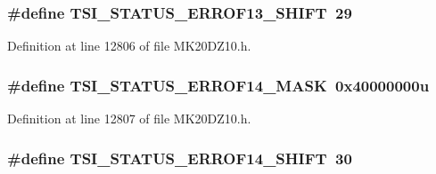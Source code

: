 \subsubsection[{\texorpdfstring{T\+S\+I\+\_\+\+S\+T\+A\+T\+U\+S\+\_\+\+E\+R\+R\+O\+F13\+\_\+\+S\+H\+I\+FT}{TSI_STATUS_ERROF13_SHIFT}}]{\setlength{\rightskip}{0pt plus 5cm}\#define T\+S\+I\+\_\+\+S\+T\+A\+T\+U\+S\+\_\+\+E\+R\+R\+O\+F13\+\_\+\+S\+H\+I\+FT~29}\hypertarget{group___t_s_i___register___masks_gaf71cb6bfa69f2ba7dd4c218c87e89da1}{}\label{group___t_s_i___register___masks_gaf71cb6bfa69f2ba7dd4c218c87e89da1}


Definition at line 12806 of file M\+K20\+D\+Z10.\+h.

\subsubsection[{\texorpdfstring{T\+S\+I\+\_\+\+S\+T\+A\+T\+U\+S\+\_\+\+E\+R\+R\+O\+F14\+\_\+\+M\+A\+SK}{TSI_STATUS_ERROF14_MASK}}]{\setlength{\rightskip}{0pt plus 5cm}\#define T\+S\+I\+\_\+\+S\+T\+A\+T\+U\+S\+\_\+\+E\+R\+R\+O\+F14\+\_\+\+M\+A\+SK~0x40000000u}\hypertarget{group___t_s_i___register___masks_gab6b75c444e249c397c5b90bd0bb9a4f0}{}\label{group___t_s_i___register___masks_gab6b75c444e249c397c5b90bd0bb9a4f0}


Definition at line 12807 of file M\+K20\+D\+Z10.\+h.

\subsubsection[{\texorpdfstring{T\+S\+I\+\_\+\+S\+T\+A\+T\+U\+S\+\_\+\+E\+R\+R\+O\+F14\+\_\+\+S\+H\+I\+FT}{TSI_STATUS_ERROF14_SHIFT}}]{\setlength{\rightskip}{0pt plus 5cm}\#define T\+S\+I\+\_\+\+S\+T\+A\+T\+U\+S\+\_\+\+E\+R\+R\+O\+F14\+\_\+\+S\+H\+I\+FT~30}\hypertarget{group___t_s_i___register___masks_gaa2c4aef04954e6fdc73361686d0f167f}{}\label{group___t_s_i___register___masks_gaa2c4aef04954e6fdc73361686d0f167f}


